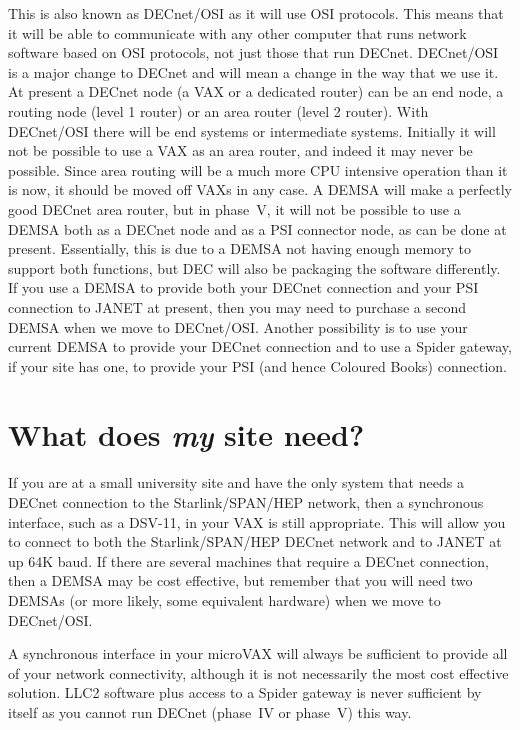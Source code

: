 This is also known as DECnet/OSI as it will use OSI protocols. This means that
it will be able to communicate with any other computer that runs network
software based on OSI protocols, not just those that run DECnet. DECnet/OSI is
a major change to DECnet and will mean a change in the way that we use it. At
present a DECnet node (a VAX or a dedicated router) can be an end node, a
routing node (level 1 router) or an area router (level 2 router). With
DECnet/OSI there will be end systems or intermediate systems. Initially it will
not be possible to use a VAX as an area router, and indeed it may never be
possible. Since area routing will be a much more CPU intensive operation than
it is now, it should be moved off VAXs in any case. A DEMSA will make a
perfectly good DECnet area router, but in phase~V, it will not be possible to
use a DEMSA both as a DECnet node and as a PSI connector node, as can be done
at present. Essentially, this is due to a DEMSA not having enough memory to
support both functions, but DEC will also be packaging the software differently.
If you use a DEMSA to provide both your DECnet connection and your PSI
connection to JANET at present, then you may need to purchase a second DEMSA
when we move to DECnet/OSI. Another possibility is to use your current DEMSA to
provide your DECnet connection and to use a Spider gateway, if your site has
one, to provide your PSI (and hence Coloured Books) connection.         

\section{What does {\em my} site need?}

If you are at a small
university site and have the only system that needs a DECnet connection to
the Starlink/SPAN/HEP network, then a synchronous interface, such as a
DSV-11, in your VAX is still appropriate. This will allow you to connect to
both the Starlink/SPAN/HEP DECnet network and to JANET at up 64K baud. If
there are several machines that require a DECnet connection, then a DEMSA
may be cost effective, but remember that you will need two DEMSAs (or more
likely, some equivalent hardware) when we move to DECnet/OSI.

A synchronous interface in your microVAX will always be sufficient to provide
all of your network connectivity, although it is not necessarily the most
cost effective solution. LLC2 software plus access to a Spider gateway is
never sufficient by itself as you cannot run DECnet (phase~IV or phase~V)
this way.

